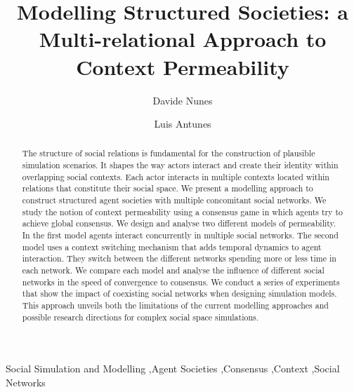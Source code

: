 \documentclass[preprint,number]{elsarticle}
\begin{document}
	\begin{frontmatter}
		
		\author[ul]{Davide Nunes}
		\author[ul]{Luis Antunes}
		
		
		\address[ul]{Group of Studies in Social Simulation (GUESS), Laboratory of Agent Modelling, University of Lisbon, 1749-016 Lisbon, Portugal}
		\title{Modelling Structured Societies: a Multi-relational Approach to Context Permeability}
		
		\begin{abstract}
			The structure of social relations is fundamental for the construction of plausible simulation scenarios. It shapes the way actors interact and create their identity within overlapping social contexts. Each actor interacts in multiple contexts located within relations that constitute their social space. We present a modelling approach to construct structured agent societies with multiple concomitant social networks. We study the notion of context permeability using a consensus game in which agents try to achieve global consensus. We design and analyse two different models of permeability. In the first model agents interact concurrently in multiple social networks. The second model uses a context switching mechanism that adds temporal dynamics to agent interaction. They switch between the different networks spending more or less time in each network. We compare each model and analyse the influence of different social networks in the speed of convergence to consensus. We conduct a series of experiments that show the impact of coexisting social networks when designing simulation models. This approach unveils both the limitations of the current modelling approaches and possible research directions for complex social space simulations.
		\end{abstract} 
		
		\begin{keyword}
			Social Simulation and Modelling \sep Agent Societies \sep Consensus \sep Context \sep Social Networks
		\end{keyword}
		
	\end{frontmatter}
	\newpage
\end{document}
